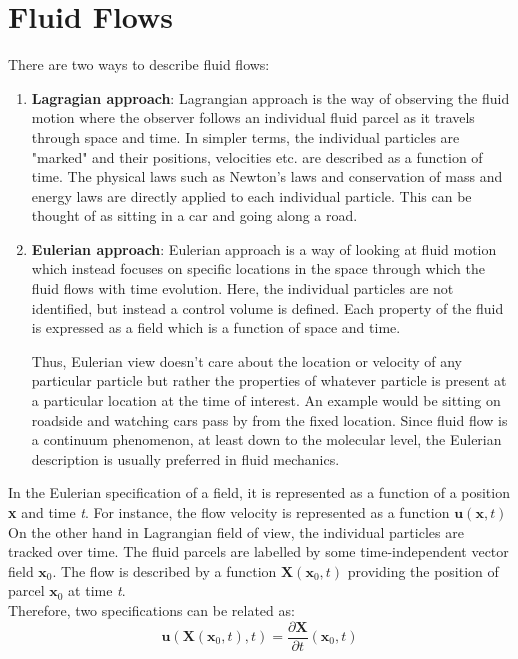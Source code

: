 \section{Fluid Flows}
There are two ways to describe fluid flows:
\begin{enumerate}[label=\Roman*]
	\item \textbf{Lagragian approach}: Lagrangian approach is the way of observing the fluid motion where the observer follows an individual fluid parcel as it travels through space and time. In simpler terms, the individual particles are "marked" and their positions, velocities etc. are described as a function of time. The physical laws such as Newton's laws and conservation of mass and energy laws are directly applied to each individual particle. This can be thought of as sitting in a car and going along a road.
	\item \textbf{Eulerian approach}: Eulerian approach is a way of looking at fluid motion which instead focuses on specific locations in the space through which the fluid flows with time evolution. Here, the individual particles are not identified, but instead a control volume is defined. Each property of the fluid is expressed as a field which is a function of space and time.
	 
	Thus, Eulerian view doesn't care about the location or velocity of any particular particle but rather the properties of whatever particle is present at a particular location at the time of interest. An example would be sitting on roadside and watching cars pass by from the fixed location. Since fluid flow is a continuum phenomenon, at least down to the molecular level, the Eulerian description is usually preferred in fluid mechanics.
\end{enumerate}
In the Eulerian specification of a field, it is represented as a function of a position \textbf{x} and time \textit{t}. For instance, the flow velocity is represented as a function
$ \textbf{u}(\textbf{x},t) $
On the other hand in Lagrangian field of view, the individual particles are tracked over time. The fluid parcels are labelled by some time-independent vector field $\textbf{x}_{0}$. The flow is described by a function $ \textbf{X}(\textbf{x}_{0},t) $ providing the position of parcel $\textbf{x}_{0}$ at time \textit{t}.
\\
Therefore, two specifications can be related as:
\begin{equation}
	\textbf{u}(\textbf{X}(\textbf{x}_{0},t),t) = \frac{\partial \textbf{X}}{\partial t}(\textbf{x}_{0},t)
\end{equation}

